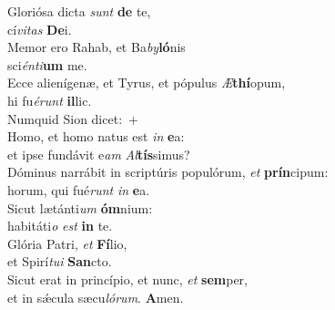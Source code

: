 \evenverse Gloriósa dicta \textit{sunt} \textbf{de} te,~\*\\
\evenverse cí\textit{vi}\textit{tas} \textbf{De}i.\\
\oddverse Memor ero Rahab, et Ba\textit{by}\textbf{ló}nis~\*\\
\oddverse sci\textit{én}\textit{ti}\textbf{um} me.\\
\evenverse Ecce alienígenæ, et Tyrus, et pópulus \textit{Æ}\textbf{thí}opum,~\*\\
\evenverse hi fu\textit{é}\textit{runt} \textbf{il}lic.\\
\oddverse Numquid Sion dicet:~+\\
\oddverse  Homo, et homo natus est \textit{in} \textbf{e}a:~\*\\
\oddverse et ipse fundávit e\textit{am} \textit{Al}\textbf{tís}simus?\\
\evenverse Dóminus narrábit in scriptúris populórum, \textit{et} \textbf{prín}cipum:~\*\\
\evenverse horum, qui fué\textit{runt} \textit{in} \textbf{e}a.\\
\oddverse Sicut lætánti\textit{um} \textbf{óm}nium:~\*\\
\oddverse habitáti\textit{o} \textit{est} \textbf{in} te.\\
\evenverse Glória Patri, \textit{et} \textbf{Fí}lio,~\*\\
\evenverse et Spirí\textit{tu}\textit{i} \textbf{San}cto.\\
\oddverse Sicut erat in princípio, et nunc, \textit{et} \textbf{sem}per,~\*\\
\oddverse et in sǽcula sæcu\textit{ló}\textit{rum}. \textbf{A}men.\\
